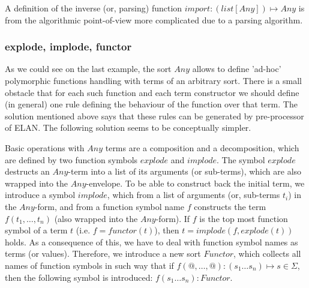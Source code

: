 \documentclass{article}
\begin{document}
{A definition of the inverse (or, parsing) function 
$import : (list[Any]) \mapsto Any$ is from the algorithmic
point-of-view more complicated due to a parsing algorithm.

\subsubsection{explode, implode, functor}

As we could see on the last example, the sort $Any$ allows to
define 'ad-hoc' polymorphic functions handling with terms of
an arbitrary sort. There is a small obstacle that for 
each such function and each term
constructor we should define (in general) one rule defining the
behaviour of the function over that term. The solution mentioned
above says that these rules can be generated by pre-processor of ELAN.
The following solution seems to be conceptually simpler.

Basic operations with $Any$ terms are a composition and a decomposition,
which are defined by two function symbols $explode$ and $implode$. 
The symbol $explode$
destructs an $Any$-term into a list of its arguments (or sub-terms), 
which are also wrapped into the $Any$-envelope. 
To be able to construct back the initial term, we introduce
a symbol $implode$, which from a list of arguments 
(or, sub-terms $t_i$) in the $Any$-form,
and from a function symbol name $f$ constructs the term $f(t_1, \ldots, t_n)$
(also wrapped into the $Any$-form).
If $f$ is the top most function symbol of a term $t$ (i.e. $f = functor(t)$), 
then $t = implode(f,explode(t))$ holds.
As a consequence of this, we have to deal with function symbol names as terms (or values).
Therefore, we introduce a new sort $Functor$, which collects all names of function symbols in such way that if
$ f(@,\ldots,@) : (s_1 \ldots s_n) \mapsto s \in \Sigma$, 
then the following symbol is introduced:
$ f(s_1 \ldots s_n)  :  Functor$.

}
\end{document}
